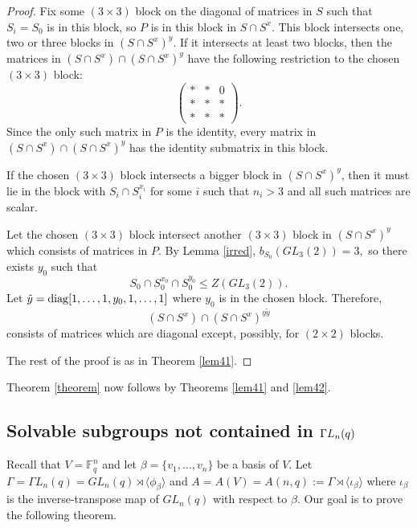 \begin{proof}
 Fix some $(3\times 3)$ block on the diagonal of matrices in $S$ such that $S_i=S_0$ is in this block, so $P$ is in this block in $S \cap S^x$.
 This block intersects  one, two or three blocks in $(S \cap S^x)^y.$  
If it intersects  at least two blocks, then the  matrices in $(S \cap S^x) \cap (S \cap S^x)^y$ have the following restriction  to the chosen $(3 \times 3)$ block:
$$
\begin{pmatrix}
*&*&0\\
*&*&*\\
*&*&*
\end{pmatrix}. 
$$ 
Since  the only such matrix in $P$ is the identity, every matrix in $(S \cap S^x) \cap (S \cap S^x)^y$ has the identity submatrix in this block.  

If the chosen $(3 \times 3)$ block intersects  a bigger block in $(S \cap S^x)^y$, then it must lie in the block with  $S_i \cap S_i^{x_i}$ for some $i$ such that $n_i>3$ and  all such matrices are scalar.

Let the chosen $(3 \times 3)$ block intersect another $(3 \times 3)$ block in $(S \cap S^x)^y$ which consists of matrices in $P$. By Lemma \ref{irred}, $b_{S_0}(GL_3(2))=3,$ so there exists $y_0$ such that $$S_0 \cap S_0^{x_0} \cap S_0^{y_0} \le Z(GL_{3}(2)).$$ Let $\tilde{y}=\mathrm{diag}[1, \ldots, 1, y_0, 1, \ldots, 1]$ where $y_0$ is in the chosen block. Therefore,
 $$(S \cap S^x) \cap (S \cap S^x)^{y\tilde{y}}$$
consists of matrices which are diagonal except, possibly, for $(2 \times 2)$ blocks.

The rest of the proof is  as in Theorem \ref{lem41}. 
\end{proof}

Theorem \ref{theorem} now follows by Theorems \ref{lem41} and \ref{lem42}.

\subsection{Solvable subgroups not contained in ${{\Gamma L}}_n(q)$}
\label{sec412}



Recall that $V=\mathbb{F}_q^n$ and let $\beta=\{v_1, \ldots, v_n\}$ be a basis of $V$. Let $\Gamma= \Gamma L _n(q)= GL_n(q) \rtimes \langle  \phi_{\beta} \rangle$
and $A=A(V)=A(n,q):=\Gamma \rtimes \langle \iota_{\beta} \rangle$ where $\iota_{\beta}$ is the inverse-transpose  map of $GL_n(q)$ with respect to $\beta.$  Our goal is to prove the following theorem.

